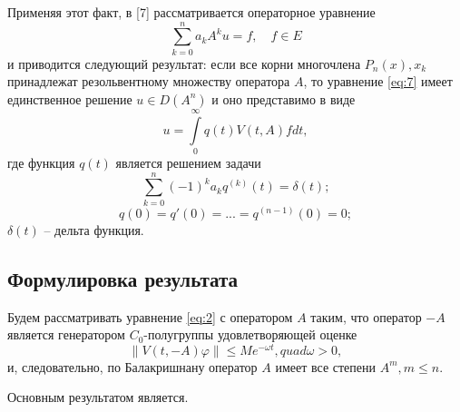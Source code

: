 \documentclass[14pt,a4paper]{article}
\theoremstyle{plain}
\numberwithin{equation}{section}
\begin{document}
Применяя этот факт, в [7] рассматривается операторное уравнение
\begin{equation}
    \label{eq:7}
    \sum_{k=0}^{n} a_k A^k u = f, \quad f \in E
\end{equation}
и приводится следующий результат: если все корни многочлена $P_n(x), x_k$ принадлежат резольвентному множеству
оператора $A$, то уравнение \ref{eq:7} имеет единственное решение $u \in D(A^n)$ и оно представимо в виде
\begin{equation}
    u = \int\limits_0^\infty q(t) V(t, A)fdt,
\end{equation}
где функция $q(t)$ является решением задачи
\begin{equation}
    \label{eq:14}
    \sum_{k=0}^{n} (-1)^k a_k q^{(k)}(t) = \delta(t);
\end{equation}
\begin{equation}
    q(0) = q'(0) = ... = q^{(n-1)}(0) = 0;
\end{equation}
$\delta(t)$ -- дельта функция.

\subsection{Формулировка результата}

Будем рассматривать уравнение \ref{eq:2} с оператором $A$ таким, что оператор $-A$ является генератором
$C_0$-полугруппы удовлетворяющей оценке
\begin{equation}
    \|V(t, -A)\varphi\| \le Me^{-\omega t}, quad \omega > 0,
\end{equation}
и, следовательно, по Балакришнану оператор $A$ имеет все степени $A^m, m \le n$.

Основным результатом является.
\end{document}
